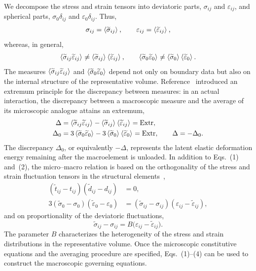We decompose the stress and strain tensors into deviatoric parts, $\sigma_{ij}$ and $\varepsilon_{ij}$, and spherical parts, $\sigma_0\delta_{ij}$ and $\varepsilon_0\delta_{ij}$. Thus,
\[
 \sigma_{ij}=\left\langle \widetilde\sigma_{ij}\right\rangle_{},\qquad
 \varepsilon_{ij}=\left\langle \widetilde\varepsilon_{ij}\right\rangle_{},
\]
whereas, in general,
\[
 \left\langle \widetilde\sigma_{ij}\widetilde\varepsilon_{ij}\right\rangle_{}
 \ne \left\langle \widetilde\sigma_{ij}\right\rangle_{}\left\langle \widetilde\varepsilon_{ij}\right\rangle_{},
 \qquad
 \left\langle \widetilde\sigma_0\widetilde\varepsilon_0\right\rangle_{}
 \ne \left\langle \widetilde\sigma_0\right\rangle_{}\left\langle \widetilde\varepsilon_0\right\rangle_{}.
\]
The measures $\left\langle \widetilde\sigma_{ij}\widetilde\varepsilon_{ij}\right\rangle_{}$ and $\left\langle \widetilde\sigma_0\widetilde\varepsilon_0\right\rangle_{}$ depend not only on boundary data but also on the internal structure of the representative volume. Reference~\cite{marina2024} introduced an extremum principle for the discrepancy between measures: in an actual interaction, the discrepancy between a macroscopic measure and the average of its microscopic analogue attains an extremum,
\begin{equation}
\begin{aligned}
 \Delta
 &=\left\langle \widetilde\sigma_{ij}\widetilde\varepsilon_{ij}\right\rangle_{}
   -\left\langle \widetilde\sigma_{ij}\right\rangle_{}\left\langle \widetilde\varepsilon_{ij}\right\rangle_{}
   =\operatorname{Extr},\\
 \Delta_0
 &=3\left\langle \widetilde\sigma_0\widetilde\varepsilon_0\right\rangle_{}
   -3\left\langle \widetilde\sigma_0\right\rangle_{}\left\langle \widetilde\varepsilon_0\right\rangle_{}
   =\operatorname{Extr},
 \qquad \Delta=-\Delta_0.
\end{aligned}
\end{equation}
The discrepancy $\Delta_0$, or equivalently $-\Delta$, represents the latent elastic deformation energy remaining after the macroelement is unloaded. In addition to Eqs.~(1) and~(2), the micro--macro relation is based on the orthogonality of the stress and strain fluctuation tensors in the structural elements~\cite{marina2024,marina1997},
\begin{equation}
\begin{aligned}
 (\widetilde t_{ij}-t_{ij})(\widetilde d_{ij}-d_{ij})&=0,\\
 3(\widetilde\sigma_0-\sigma_0)(\widetilde\varepsilon_0-\varepsilon_0)
 &= (\widetilde\sigma_{ij}-\sigma_{ij})
    (\varepsilon_{ij}-\widetilde\varepsilon_{ij}),
\end{aligned}
\end{equation}
and on proportionality of the deviatoric fluctuations,
\begin{equation}
 \widetilde\sigma_{ij}-\sigma_{ij}
 =B\bigl(\varepsilon_{ij}-\widetilde\varepsilon_{ij}\bigr).
\end{equation}
The parameter $B$ characterizes the heterogeneity of the stress and strain distributions in the representative volume. Once the microscopic constitutive equations and the averaging procedure are specified, Eqs.~(1)--(4) can be used to construct the macroscopic governing equations.

